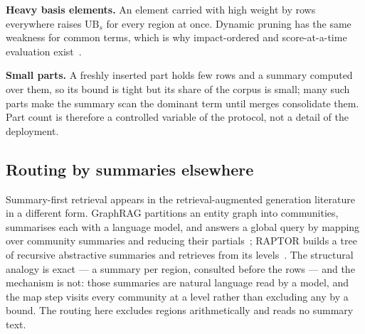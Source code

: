 \textbf{Heavy basis elements.} An element carried with high weight by rows
everywhere raises $\mathrm{UB}_s$ for every region at once. Dynamic pruning has
the same weakness for common terms, which is why impact-ordered and
score-at-a-time evaluation exist~\cite{anh2002impact,lin2015anytime}.

\textbf{Small parts.} A freshly inserted part holds few rows and a summary
computed over them, so its bound is tight but its share of the corpus is
small; many such parts make the summary scan the dominant term until merges
consolidate them. Part count is therefore a controlled variable of the
protocol, not a detail of the deployment.

\subsection{Routing by summaries elsewhere}

\prior{} Summary-first retrieval appears in the retrieval-augmented generation
literature in a different form. GraphRAG partitions an entity graph into
communities, summarises each with a language model, and answers a global query
by mapping over community summaries and reducing their
partials~\cite{edge2024graphrag}; RAPTOR builds a tree of recursive abstractive
summaries and retrieves from its levels~\cite{sarthi2024raptor}. The structural
analogy is exact --- a summary per region, consulted before the rows --- and
the mechanism is not: those summaries are natural language read by a model, and
the map step visits every community at a level rather than excluding any by a
bound. The routing here excludes regions arithmetically and reads no summary
text.
